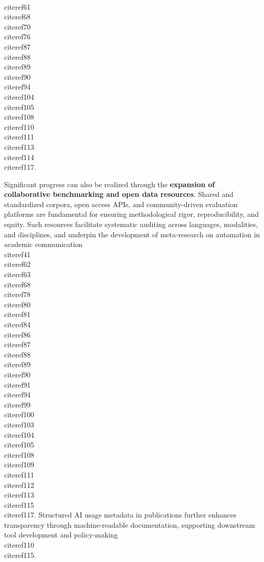 \documentclass[11pt]{article}
\begin{document}
\\cite{ref61}\\cite{ref68}\\cite{ref70}\\cite{ref76}\\cite{ref87}\\cite{ref88}\\cite{ref89}\\cite{ref90}\\cite{ref94}\\cite{ref104}\\cite{ref105}\\cite{ref108}\\cite{ref110}\\cite{ref111}\\cite{ref113}\\cite{ref114}\\cite{ref117}.

Significant progress can also be realized through the \textbf{expansion of collaborative benchmarking and open data resources}. Shared and standardized corpora, open access APIs, and community-driven evaluation platforms are fundamental for ensuring methodological rigor, reproducibility, and equity. Such resources facilitate systematic auditing across languages, modalities, and disciplines, and underpin the development of meta-research on automation in academic communication \\cite{ref41}\\cite{ref62}\\cite{ref63}\\cite{ref68}\\cite{ref78}\\cite{ref80}\\cite{ref81}\\cite{ref84}\\cite{ref86}\\cite{ref87}\\cite{ref88}\\cite{ref89}\\cite{ref90}\\cite{ref91}\\cite{ref94}\\cite{ref99}\\cite{ref100}\\cite{ref103}\\cite{ref104}\\cite{ref105}\\cite{ref108}\\cite{ref109}\\cite{ref111}\\cite{ref112}\\cite{ref113}\\cite{ref115}\\cite{ref117}. Structured AI usage metadata in publications further enhances transparency through machine-readable documentation, supporting downstream tool development and policy-making \\cite{ref110}\\cite{ref115}.
\end{document}
